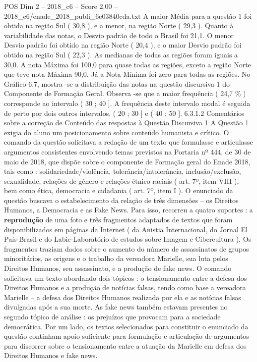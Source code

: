 \begin{textsample}{POS Dim 2 – 2018\_c6 – Score 2.00 – 2018\_c6/enade\_2018\_publi\_6e03840cda.txt}
A maior Média para a questão 1 foi obtida na região Sul ( 30,8 ), e a menor, na região Norte ( 29,3 ).
Quanto à variabilidade das notas, o Desvio padrão de todo o Brasil foi 21,1.
O menor Desvio padrão foi obtido na região Norte ( 20,4 ), e o maior Desvio padrão foi obtido na região Sul ( 22,3 ).
As medianas de todas as regiões foram iguais a 30,0.
A nota Máxima foi 100,0 para quase todas as regiões, exceto a região Norte que teve nota Máxima 90,0.
Já a Nota Mínima foi zero para todas as regiões.
No Gráfico 6.7, mostra -se a distribuição das notas na questão discursiva 1 do Componente de Formação Geral.
Observa -se que a maior frequência ( 24,7 \% ) corresponde ao intervalo ( 30 ; 40 ].
A frequência deste intervalo modal é seguida de perto por dois outros intervalos, ( 20 ; 30 ] e ( 40 ; 50 ]. 6.3.1.2 Comentários sobre a correção de Conteúdo das respostas à Questão Discursiva 1 A Questão 1 exigia do aluno um posicionamento sobre conteúdo humanista e crítico.
O comando da questão solicitava a redação de um texto que formulasse e articulasse argumentos consistentes envolvendo temas previstos na Portaria nº 444, de 30 de maio de 2018, que dispõe sobre o componente de Formação geral do Enade 2018, tais como : solidariedade/violência, tolerância/intolerância, inclusão/exclusão, sexualidade, relações de gênero e relações étnico-raciais ( art. 7º, item VIII ), bem como ética, democracia e cidadania ( art. 7º, item I ).
O enunciado da questão buscava o estabelecimento da relação de três dimensões – os Direitos Humanos, a Democracia e as Fake News.
Para isso, recorreu a quatro suportes : a \textbf{reprodução} de uma foto e três fragmentos adaptados de textos que foram disponibilizados em páginas da Internet ( da Anistia Internacional, do Jornal El País-Brasil e do Labic-Laboratório de estudos sobre Imagem e Cibercultura ).
Os fragmentos traziam dados sobre o aumento do número de assassinatos de grupos minoritários, as origens e o trabalho da vereadora Marielle, sua luta pelos Direitos Humanos, seu assassinato, e a produção de fake news.
O comando solicitava um texto abordando dois tópicos : o tensionamento entre a defesa dos Direitos Humanos e a produção de notícias falsas, tendo como base a vereadora Marielle – a defesa dos Direitos Humanos realizada por ela e as notícias falsas divulgadas após a sua morte.
As fake news também estavam presentes no segundo tópico de análise : os prejuízos que provocam para a sociedade democrática.
Por um lado, os textos selecionados para constituir o enunciado da questão continham apoio suficiente para formulação e articulação de argumentos para discorrer sobre o tensionamento entre a atuação da Marielle em defesa dos Direitos Humanos e fake news.

\end{textsample}
